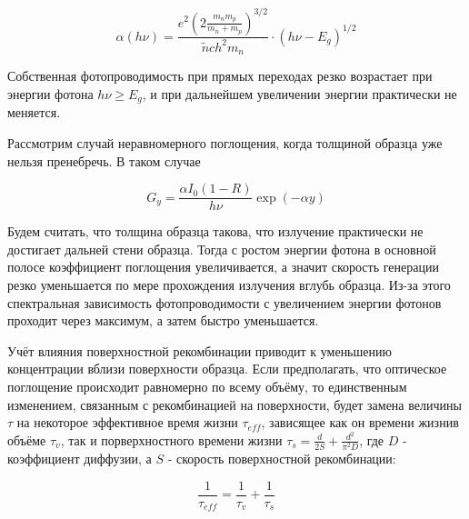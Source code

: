 \begin{equation}
\alpha(h \nu) = \frac{e^2 \left( 2 \frac{m_{n} m_{p}}{m_{n} + m_{p}} \right)^{3/2}}{\tilde{n} c h^2 m_{n}} \cdot (h \nu - E_{g})^{1/2}
\end{equation}

Собственная фотопроводимость при прямых переходах резко возрастает при энергии фотона $h \nu \ge E_{g}$, и при дальнейшем увеличении энергии практически не меняется.

Рассмотрим случай неравномерного поглощения, когда толщиной образца уже нельзя пренебречь. В таком случае

\begin{equation}
G_{y} = \frac{\alpha I_{0} (1-R)}{h \nu} \exp(-\alpha y)
\end{equation}

Будем считать, что толщина образца такова, что излучение практически не достигает дальней стени образца. Тогда с ростом энергии фотона в основной полосе коэффициент поглощения увеличивается, а значит скорость генерации резко уменьшается по мере прохождения излучения вглубь образца. Из-за этого спектральная зависимость фотопроводимости с увеличением энергии фотонов проходит через максимум, а затем быстро уменьшается.

Учёт влияния поверхностной рекомбинации приводит к уменьшению концентрации вблизи поверхности образца. Если предполагать, что оптическое поглощение происходит равномерно по всему объёму, то единственным изменением, связанным с рекомбинацией на поверхности, будет замена величины $\tau$ на некоторое эффективное время жизни $\tau_{eff}$, зависящее как он времени жизнив объёме $\tau_{v}$, так и порверхностного времени жизни $\tau_{s} = \frac{d}{2 S} + \frac{d^2}{\pi^2 D}$, где $D$ - коэффициент диффузии, а $S$ - скорость поверхностной рекомбинации:

\begin{equation}
\frac{1}{\tau_{eff}} = \frac{1}{\tau_{v}} + \frac{1}{\tau_{s}}
\end{equation}

